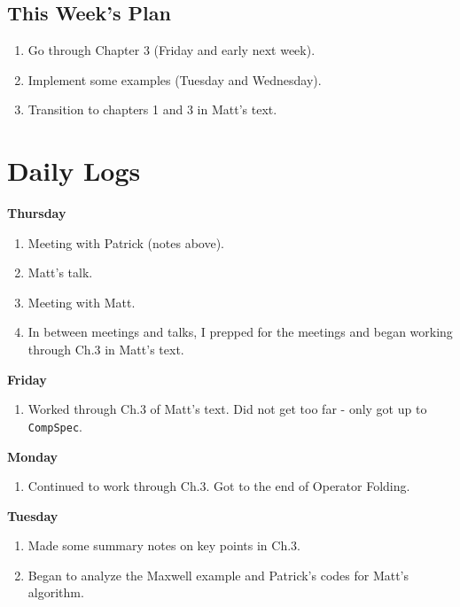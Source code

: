 \documentclass[12pt,a4paper]{article}
\begin{document}
\subsection{This Week's Plan}

\begin{enumerate}

    \item Go through Chapter 3 (Friday and early next week).
    \item Implement some examples (Tuesday and Wednesday).
    \item Transition to chapters 1 and 3 in Matt's text. 
    

\end{enumerate}


\section{Daily Logs}

\textbf{Thursday}

\begin{enumerate}
    \item Meeting with Patrick (notes above).
    \item Matt's talk.
    \item Meeting with Matt.
    \item In between meetings and talks, I prepped for the meetings and began working through Ch.3 in Matt's text.
\end{enumerate}

\textbf{Friday}

\begin{enumerate}
    \item Worked through Ch.3 of Matt's text. Did not get too far - only got up to \texttt{CompSpec}.
\end{enumerate}

\textbf{Monday}

\begin{enumerate}
    \item Continued to work through Ch.3. Got to the end of Operator Folding.
\end{enumerate}

\textbf{Tuesday}

\begin{enumerate}
    \item Made some summary notes on key points in Ch.3.
    \item Began to analyze the Maxwell example and Patrick's codes for Matt's algorithm.
\end{enumerate}
\end{document}
